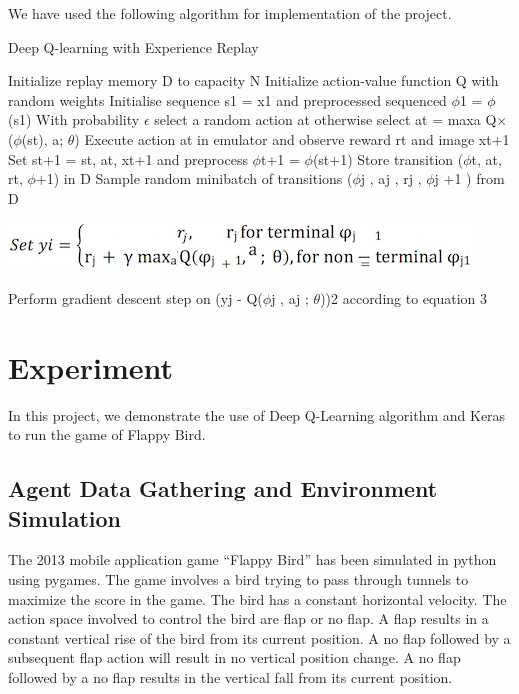 \documentclass{article}
\begin{document}
We have used the following algorithm for implementation of the project.

\begin{algorithm}[H]
  \caption{Deep Q-learning with Experience Replay }

  \begin{algorithmic}
    \State Initialize replay memory D to capacity N
    \State Initialize action-value function Q with random weights 
    \State Initialise sequence s1 = x1 and preprocessed sequenced  $\phi$1 = $\phi$(s1)
    \State With probability $\epsilon$ select a random action at
\State otherwise select at = maxa Q$\times$($\phi$(st), a; $\theta$)
\State Execute action at in emulator and observe reward rt and image xt+1 
\State Set st+1 = st, at, xt+1 and preprocess $\phi$t+1 = $\phi$(st+1)
\State Store transition ($\phi$t, at, rt, $\phi$+1) in D
\State Sample random minibatch of transitions ($\phi$j , aj , rj , $\phi$j +1 ) from D 
\State \begin{center}
    \includegraphics{algo1}
\end{center}
\State Perform gradient descent step on (yj  - Q($\phi$j , aj ; $\theta$))2 according to equation 3

\EndFor
    \EndFor
  \end{algorithmic}
\end{algorithm}

\section{Experiment}

In this project, we demonstrate the use of Deep Q-Learning algorithm and Keras to run the game of Flappy Bird. 

\subsection{Agent Data Gathering and Environment Simulation}

The 2013 mobile application game “Flappy Bird” has been simulated in python using pygames. The game involves a bird trying to pass through tunnels to maximize the score in the game. The bird has a constant horizontal velocity. The action space involved to control the bird are flap or no flap. A flap results in a constant vertical rise of the bird from its current position. A no flap followed by a subsequent flap action will result in no vertical position change. A no flap followed by a no flap results in the vertical fall from its current position.
\end{document}
